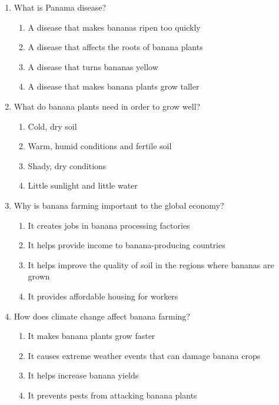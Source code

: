 \documentclass[12pt]{article}
\begin{document}
\begin{enumerate}
    \item What is Panama disease?

    \begin{enumerate}[label=\Alph*.]
        \item A disease that makes bananas ripen too quickly
        \item A disease that affects the roots of banana plants
        \item A disease that turns bananas yellow
        \item A disease that makes banana plants grow taller
    \end{enumerate}
    
    \vspace{0.5cm}

    \item What do banana plants need in order to grow well?

    \begin{enumerate}[label=\Alph*.]
        \item Cold, dry soil
        \item Warm, humid conditions and fertile soil
        \item Shady, dry conditions
        \item Little sunlight and little water
    \end{enumerate}
    
    \vspace{0.5cm}

    \item Why is banana farming important to the global economy?

    \begin{enumerate}[label=\Alph*.]
        \item It creates jobs in banana processing factories
        \item It helps provide income to banana-producing countries
        \item It helps improve the quality of soil in the regions where bananas are grown
        \item It provides affordable housing for workers
    \end{enumerate}
    
    \vspace{0.5cm}

    \item How does climate change affect banana farming?

    \begin{enumerate}[label=\Alph*.]
        \item It makes banana plants grow faster
        \item It causes extreme weather events that can damage banana crops
        \item It helps increase banana yields
        \item It prevents pests from attacking banana plants
    \end{enumerate}
    

\end{enumerate}
\end{document}
